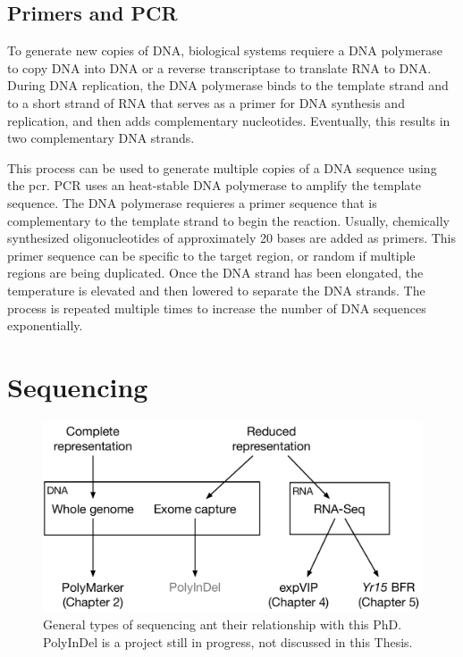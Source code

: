 \subsection{Primers and PCR}
To generate new copies of DNA, biological systems requiere a DNA polymerase to copy DNA into DNA or a reverse transcriptase to translate RNA to DNA. During DNA replication, the DNA polymerase binds to the template strand and to a short strand of RNA that serves as a primer for DNA synthesis and replication, and then adds complementary nucleotides. Eventually, this results in two complementary DNA strands\cite{alberts2014molecular}.

This process can be used to generate multiple copies of a DNA sequence using the \gls{pcr}. PCR uses an heat-stable DNA polymerase to amplify the template sequence. The DNA polymerase requieres a primer sequence that is complementary to the template strand to begin the reaction. Usually, chemically synthesized oligonucleotides of approximately 20 bases are added as primers. This primer sequence can be specific to the target region, or random if multiple regions are being duplicated. Once the DNA strand has been elongated, the temperature is elevated and then lowered to separate the DNA strands. The process is repeated multiple times to increase the number of DNA sequences exponentially\cite{alberts2014molecular}.


  
\section{Sequencing} 


\begin{figure}
\includegraphics[width=1\textwidth]{LitReview/Figures/typesOfSequencing.pdf}
\caption{General types of sequencing ant their relationship with this PhD. PolyInDel is a project still in progress, not discussed in this Thesis. }
\end{figure}
